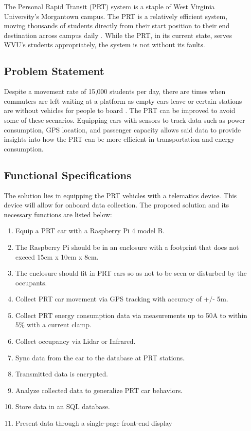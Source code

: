 The Personal Rapid Transit (PRT) system is a staple of West Virginia University’s Morgantown campus. The PRT is a relatively efficient system, moving thousands of students directly from their start position to their end destination across campus daily \cite{about-prt}. While the PRT, in its current state, serves WVU’s students appropriately, the system is not without its faults.

\subsection{Problem Statement}
Despite a movement rate of 15,000 students per day, there are times when commuters are left waiting at a platform as empty cars leave or certain stations are without vehicles for people to board \cite{about-prt}. The PRT can be improved to avoid some of these scenarios. Equipping cars with sensors to track data such as power consumption, GPS location, and passenger capacity allows said data to provide insights into how the PRT can be more efficient in transportation and energy consumption.
\subsection{Functional Specifications}
The solution lies in equipping the PRT vehicles with a telematics device. This device will allow for onboard data collection. The proposed solution and its necessary functions are listed below:
\begin{enumerate}
    \item Equip a PRT car with a Raspberry Pi 4 model B.
    \item The Raspberry Pi should be in an enclosure with a footprint that does not exceed 15cm x 10cm x 8cm.
    \item The enclosure should fit in PRT cars so as not to be seen or disturbed by the occupants.
    \item Collect PRT car movement via GPS tracking with accuracy of +/- 5m.
    \item Collect PRT energy consumption data via measurements up to 50A to within 5\% with a current clamp.
    \item Collect occupancy via Lidar or Infrared.
    \item Sync data from the car to the database at PRT stations.
    \item Transmitted data is encrypted.
    \item Analyze collected data to generalize PRT car behaviors.
    \item Store data in an SQL database.
    \item Present data through a single-page front-end display
\end{enumerate}


